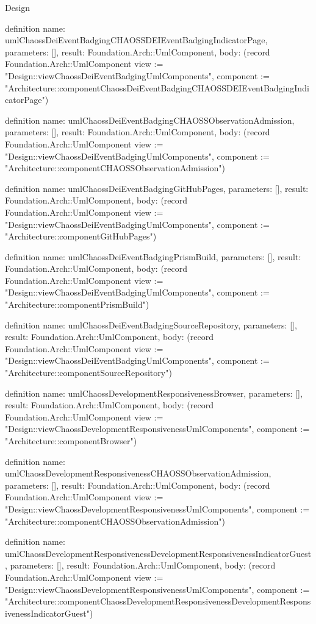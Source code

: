 \begin{lexlean}{Design}
\begin{semanticmodule}
definition{
  name: umlChaossDeiEventBadgingCHAOSSDEIEventBadgingIndicatorPage,
  parameters: [],
  result: Foundation.Arch::UmlComponent,
  body: (record Foundation.Arch::UmlComponent {view := "Design::viewChaossDeiEventBadgingUmlComponents", component := "Architecture::componentChaossDeiEventBadgingCHAOSSDEIEventBadgingIndicatorPage"})
}

definition{
  name: umlChaossDeiEventBadgingCHAOSSObservationAdmission,
  parameters: [],
  result: Foundation.Arch::UmlComponent,
  body: (record Foundation.Arch::UmlComponent {view := "Design::viewChaossDeiEventBadgingUmlComponents", component := "Architecture::componentCHAOSSObservationAdmission"})
}

definition{
  name: umlChaossDeiEventBadgingGitHubPages,
  parameters: [],
  result: Foundation.Arch::UmlComponent,
  body: (record Foundation.Arch::UmlComponent {view := "Design::viewChaossDeiEventBadgingUmlComponents", component := "Architecture::componentGitHubPages"})
}

definition{
  name: umlChaossDeiEventBadgingPrismBuild,
  parameters: [],
  result: Foundation.Arch::UmlComponent,
  body: (record Foundation.Arch::UmlComponent {view := "Design::viewChaossDeiEventBadgingUmlComponents", component := "Architecture::componentPrismBuild"})
}

definition{
  name: umlChaossDeiEventBadgingSourceRepository,
  parameters: [],
  result: Foundation.Arch::UmlComponent,
  body: (record Foundation.Arch::UmlComponent {view := "Design::viewChaossDeiEventBadgingUmlComponents", component := "Architecture::componentSourceRepository"})
}

definition{
  name: umlChaossDevelopmentResponsivenessBrowser,
  parameters: [],
  result: Foundation.Arch::UmlComponent,
  body: (record Foundation.Arch::UmlComponent {view := "Design::viewChaossDevelopmentResponsivenessUmlComponents", component := "Architecture::componentBrowser"})
}

definition{
  name: umlChaossDevelopmentResponsivenessCHAOSSObservationAdmission,
  parameters: [],
  result: Foundation.Arch::UmlComponent,
  body: (record Foundation.Arch::UmlComponent {view := "Design::viewChaossDevelopmentResponsivenessUmlComponents", component := "Architecture::componentCHAOSSObservationAdmission"})
}

definition{
  name: umlChaossDevelopmentResponsivenessDevelopmentResponsivenessIndicatorGuest,
  parameters: [],
  result: Foundation.Arch::UmlComponent,
  body: (record Foundation.Arch::UmlComponent {view := "Design::viewChaossDevelopmentResponsivenessUmlComponents", component := "Architecture::componentChaossDevelopmentResponsivenessDevelopmentResponsivenessIndicatorGuest"})
}


\end{semanticmodule}
\end{lexlean}
